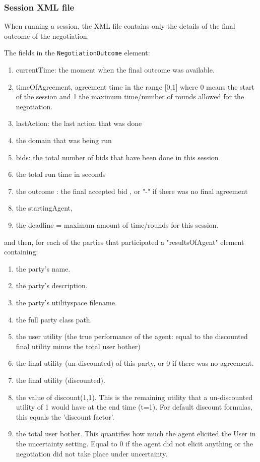 \documentclass[]{article}
\begin{document}
\subsubsection{Session XML file}
When running a session, the XML file contains only the details of the final outcome of the negotiation.

The fields in the \verb|NegotiationOutcome| element:\label{table:NegotiationOutcome}
\begin{enumerate}
\item currentTime: the moment when the final outcome was available. 
\item timeOfAgreement, agreement time in the range [0,1] where 0 means the start of the session and 1 the maximum time/number of rounds allowed for the negotiation. 
\item lastAction: the last action that was done
\item the domain that was being run
\item bids: the total number of bids that have been done in this session
\item the total run time in seconds
\item the outcome : the final accepted bid , or "-" if there was no final agreement
\item the startingAgent,
\item the deadline = maximum amount of time/rounds for this session.
\end{enumerate}

and then, for each of the parties that participated a "resultsOfAgent" element containing:
\begin{enumerate}
\item the party's name. 
\item the party's description.
\item the party's utilityspace filename.
\item the full party class path.
\item the user utility (the true performance of the agent: equal to the discounted final utility minus the total user bother)
\item the final utility (un-discounted) of this party, or 0 if there was no agreement.
\item the final utility (discounted).
\item the value of discount(1,1). This is the remaining utility that a un-discounted utility of 1 would have at the end time (t=1). For default discount formulas, this equals the 'discount factor'.
\item the total user bother. This quantifies how much the agent elicited the User in the uncertainty setting. Equal to 0 if the agent did not elicit anything or the negotiation did not take place under uncertainty.
\end{enumerate}
\end{document}

